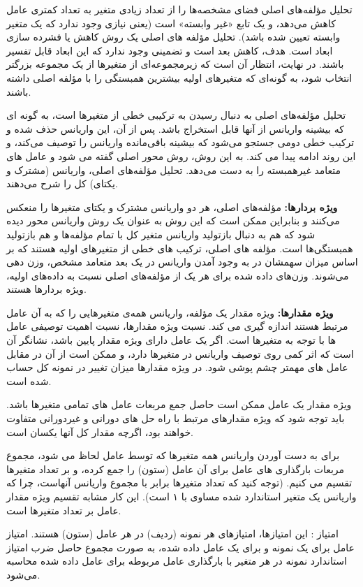 تحلیل مؤلفه‌های اصلی فضای مشخصه‌ها را از تعداد زیادی متغیر به تعداد کمتری عامل کاهش می‌دهد، و یک تابع «غیر وابسته» است (یعنی نیازی وجود ندارد که یک متغیر وابسته تعیین شده باشد).
تحلیل مؤلفه های اصلی یک روش کاهش یا فشرده سازی ابعاد است. هدف، کاهش بعد است و تضمینی وجود ندارد که این ابعاد قابل تفسیر باشند.
در نهایت، انتظار آن است که زیرمجموعه‌ای از متغیرها از یک مجموعه بزرگتر انتخاب شود، به گونه‌ای که متغیرهای اولیه بیشترین همبستگی را با مؤلفه اصلی داشته باشند.

تحلیل مؤلفه‌های اصلی به دنبال رسیدن به ترکیبی خطی از متغیرها است، به گونه ای که بیشینه واریانس از آنها قابل استخراج باشد. پس از آن، این واریانس حذف شده و ترکیب خطی دومی جستجو می‌شود که بیشینه باقی‌مانده واریانس را توصیف می‌کند، و این روند ادامه پیدا می کند. به این روش، روش محور اصلی گفته می شود و عامل های متعامد غیرهمبسته را به دست می‌دهد. تحلیل مؤلفه‌های اصلی، واریانس (مشترک و یکتای) کل را شرح می‌دهند.

\textbf{
ویژه بردارها:
} مؤلفه‌های اصلی، هر دو واریانس مشترک و یکتای متغیرها را منعکس می‌کنند و بنابراین ممکن است که این روش به عنوان یک روش واریانس محور دیده شود که هم به دنبال بازتولید واریانس متغیر کل با تمام مؤلفه‌ها و هم بازتولید همبستگی‌ها است.
مؤلفه های اصلی، ترکیب های خطی از متغیرهای اولیه هستند که بر اساس میزان سهمشان در به وجود آمدن واریانس در یک بعد متعامد مشخص، وزن دهی می‌شوند. وزن‌های داده شده برای هر یک از مؤلفه‌های اصلی نسبت به داده‌های اولیه، ویژه بردارها هستند.

\textbf{
ویژه مقدارها:
}
 ویژه مقدار یک مؤلفه، واریانس همه‌ی متغیرهایی را که به آن عامل مرتبط هستند اندازه گیری می کند.
نسبت ویژه مقدارها، نسبت اهمیت توصیفی عامل ها با توجه به متغیرها است. اگر یک عامل دارای ویژه مقدار پایین باشد، نشانگر آن است که اثر کمی روی توصیف واریانس در متغیرها دارد، و ممکن است از آن در مقابل عامل های مهمتر چشم پوشی شود.
در ویژه مقدارها میزان تغییر در نمونه کل حساب شده است.

ویژه مقدار یک عامل ممکن است حاصل جمع مربعات عامل های تمامی متغیرها باشد. باید توجه شود که ویژه مقدارهای مرتبط با راه حل های دورانی و غیردورانی متفاوت خواهند بود، اگرچه مقدار کل آنها یکسان است.

برای به دست آوردن واریانس همه متغیرها که توسط عامل لحاظ می شود، مجموع مربعات بارگذاری های عامل برای آن عامل (ستون) را جمع کرده، و بر تعداد متغیرها تقسیم می کنیم. (توجه کنید که تعداد متغیرها برابر با مجموع واریانس آنهاست، چرا که واریانس یک متغیر استاندارد شده مساوی با ۱ است). این کار مشابه تقسیم ویژه مقدار عامل بر تعداد متغیرها است.

امتیاز 
: این امتیازها، امتیازهای هر نمونه (ردیف) در هر عامل (ستون) هستند. امتیاز عامل برای یک نمونه و برای یک عامل داده شده، به صورت مجموع حاصل ضرب  امتیاز استاندارد نمونه در هر متغیر با بارگذاری عامل مربوطه برای عامل داده شده محاسبه می‌شود.
\cite{site_pca}


